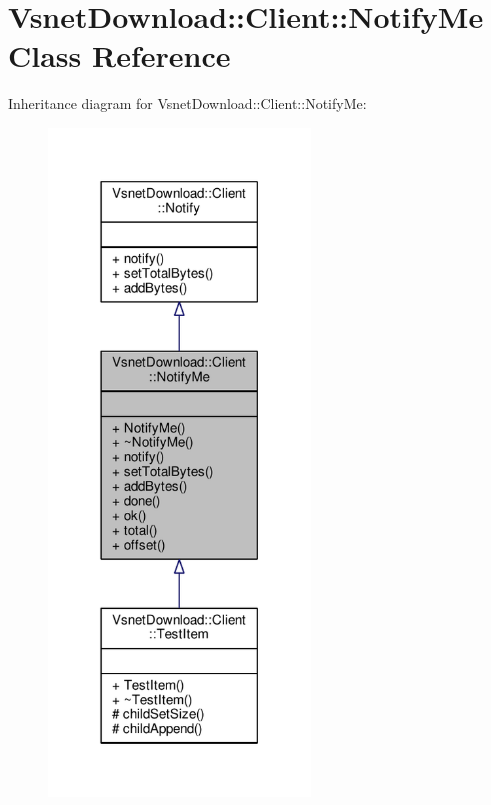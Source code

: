 \hypertarget{classVsnetDownload_1_1Client_1_1NotifyMe}{}\section{Vsnet\+Download\+:\+:Client\+:\+:Notify\+Me Class Reference}
\label{classVsnetDownload_1_1Client_1_1NotifyMe}


Inheritance diagram for Vsnet\+Download\+:\+:Client\+:\+:Notify\+Me\+:
\nopagebreak
\begin{figure}[H]
\begin{center}
\leavevmode
\includegraphics[width=197pt]{dd/d1b/classVsnetDownload_1_1Client_1_1NotifyMe__inherit__graph}
\end{center}
\end{figure}


